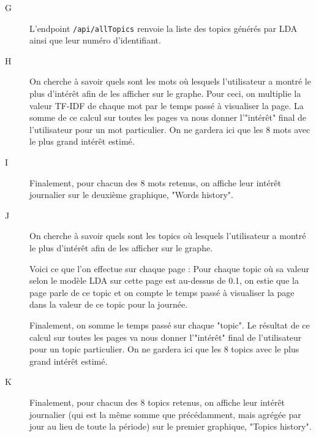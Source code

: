 \begin{description}
				\item[G] L'endpoint \texttt{/api/allTopics} renvoie la liste des topics générés par LDA ainsi que leur numéro d'identifiant.

				\item[H] On cherche à savoir quels sont les mots où lesquels l'utilisateur a montré le plus d'intérêt afin de les afficher sur le graphe. Pour ceci, on multiplie la valeur TF-IDF de chaque mot par le temps passé à visualiser la page. La somme de ce calcul sur toutes les pages va nous donner l'"intérêt" final de l'utilisateur pour un mot particulier. On ne gardera ici que les 8 mots avec le plus grand intérêt estimé.

				\item[I] Finalement, pour chacun des 8 mots retenus, on affiche leur intérêt journalier sur le deuxième graphique, "Words history".

				\item[J] On cherche à savoir quels sont les topics où lesquels l'utilisateur a montré le plus d'intérêt afin de les afficher sur le graphe.

				Voici ce que l'on effectue sur chaque page : Pour chaque topic où sa valeur selon le modèle LDA sur cette page est au-dessus de 0.1, on estie que la page parle de ce topic et on compte le temps passé à visualiser la page dans la valeur de ce topic pour la journée.

				Finalement, on somme le temps passé sur chaque "topic". Le résultat de ce calcul sur toutes les pages va nous donner l'"intérêt" final de l'utilisateur pour un topic particulier. On ne gardera ici que les 8 topics avec le plus grand intérêt estimé.

				\item[K] Finalement, pour chacun des 8 topics retenus, on affiche leur intérêt journalier (qui est la même somme que précédamment, mais agrégée par jour au lieu de toute la période) sur le premier graphique, "Topics history".
			\end{description}


